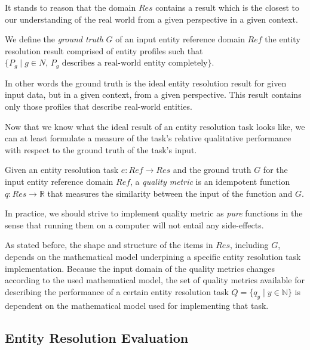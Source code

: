 \documentclass[11pt]{article}
\begin{document}
    It stands to reason that the domain $Res$ contains a result which is the
    closest to our understanding of the real world from a given perspective in
    a given context.

    \begin{defn}
        We define the \textit{ground truth} $G$ of an input entity reference
        domain $Ref$ the entity resolution result comprised of entity profiles
        such that
        $\{P_g \mid g \in N\textrm{, $P_g$ describes a real-world entity
        completely}\}$.
    \end{defn}

    In other words the ground truth is the ideal entity resolution result for 
    given input data, but in a given context, from a given perspective.
    This result contains only those profiles that describe real-world entities.

    Now that we know what the ideal result of an entity resolution task looks
    like, we can at least formulate a measure of the task's relative qualitative
    performance with respect to the ground truth of the task's input.
    
    \begin{defn}
    Given an entity resolution task $e: Ref \rightarrow Res$ and the ground
    truth $G$ for the input entity reference domain $Ref$, a \textit{quality
    metric} is an idempotent function $q: Res \rightarrow \mathbb{R}$ that
    measures the similarity between the input of the function and $G$.
    \end{defn}

    In practice, we should strive to implement quality metric as \textit{pure}
    functions in the sense that running them on a computer will not entail any
    side-effects.

    As stated before, the shape and structure of the items in $Res$, including
    $G$, depends on the mathematical model underpining a specific entity
    resolution task implementation.
    Because the input domain of the quality metrics changes according to the
    used mathematical model, the set of quality metrics available for describing
    the performance of a certain entity resolution task $Q = \{q_y \mid y \in
    \mathbb{N}\}$ is dependent on the mathematical model used for implementing
    that task.

    \subsection[ere]{Entity Resolution Evaluation}\label{sec:ere}
\end{document}
